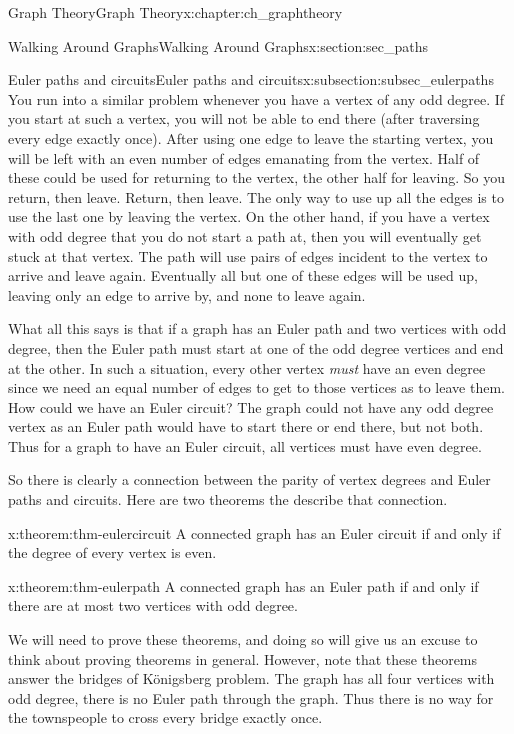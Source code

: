 \documentclass[oneside,10pt,]{book}
\numberwithin{equation}{chapter}
\begin{document}
\begin{chapterptx}{Graph Theory}{}{Graph Theory}{}{}{x:chapter:ch_graphtheory}
\begin{sectionptx}{Walking Around Graphs}{}{Walking Around Graphs}{}{}{x:section:sec_paths}
\begin{subsectionptx}{Euler paths and circuits}{}{Euler paths and circuits}{}{}{x:subsection:subsec_eulerpaths}
You run into a similar problem whenever you have a vertex of any odd degree. If you start at such a vertex, you will not be able to end there (after traversing every edge exactly once). After using one edge to leave the starting vertex, you will be left with an even number of edges emanating from the vertex. Half of these could be used for returning to the vertex, the other half for leaving. So you return, then leave. Return, then leave. The only way to use up all the edges is to use the last one by leaving the vertex. On the other hand, if you have a vertex with odd degree that you do not start a path at, then you will eventually get stuck at that vertex. The path will use pairs of edges incident to the vertex to arrive and leave again. Eventually all but one of these edges will be used up, leaving only an edge to arrive by, and none to leave again.%
\par
What all this says is that if a graph has an Euler path and two vertices with odd degree, then the Euler path must start at one of the odd degree vertices and end at the other. In such a situation, every other vertex \emph{must} have an even degree since we need an equal number of edges to get to those vertices as to leave them. How could we have an Euler circuit? The graph could not have any odd degree vertex as an Euler path would have to start there or end there, but not both. Thus for a graph to have an Euler circuit, all vertices must have even degree.%
\par
So there is clearly a connection between the parity of vertex degrees and Euler paths and circuits.  Here are two theorems the describe that connection.%
\begin{theorem}{}{}{x:theorem:thm-eulercircuit}%
A connected graph has an Euler circuit if and only if the degree of every vertex is even.%
\end{theorem}
\begin{theorem}{}{}{x:theorem:thm-eulerpath}%
A connected graph has an Euler path if and only if there are at most two vertices with odd degree.%
\end{theorem}
We will need to prove these theorems, and doing so will give us an excuse to think about proving theorems in general.  However, note that these theorems answer the bridges of Königsberg problem.  The graph has all four vertices with odd degree, there is no Euler path through the graph.  Thus there is no way for the townspeople to cross every bridge exactly once.%
\end{subsectionptx}
%
%
\typeout{************************************************}

\end{sectionptx}
\end{chapterptx}
\end{document}
